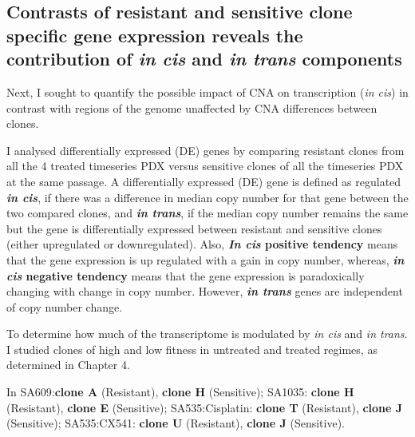 
\subsection{Contrasts of resistant and sensitive clone specific gene expression reveals the contribution of \textit{in cis} and \textit{in trans} components}

Next, I sought to quantify the possible impact of CNA on transcription (\textit{in cis}) in contrast with regions of the genome unaffected by CNA differences between clones.


I analysed differentially expressed (DE) genes by comparing resistant clones from all the 4 treated timeseries PDX versus sensitive clones of all the timeseries PDX at the same passage. A  differentially expressed (DE) gene is defined as regulated \textbf{\textit{in cis}}, if there was a difference in median copy number for that gene between the two compared clones, and \textbf{\textit{in trans}}, if the median copy number remains the same but the gene is differentially expressed between resistant and sensitive clones (either upregulated or downregulated). Also, \textbf{{\textit{In cis} positive tendency}} means that the gene expression is up regulated with a gain in copy number, whereas, \textbf{{\textit{in cis} negative tendency}} means that the gene expression is paradoxically changing with change in copy number. However, \textbf{\textit{in trans}} genes are independent of copy number change.

To determine how much of the transcriptome is modulated by \textit{in cis} and \textit{in trans}. I studied clones of high and low fitness in untreated and treated regimes, as determined in Chapter 4.

 In SA609:\textbf{clone A} (Resistant), \textbf{clone H} (Sensitive);  SA1035: \textbf{clone H} (Resistant), \textbf{clone E} (Sensitive); SA535:Cisplatin: \textbf{clone T} (Resistant), \textbf{clone J} (Sensitive); SA535:CX541: \textbf{clone U} (Resistant), \textbf{clone J} (Sensitive). 
 
